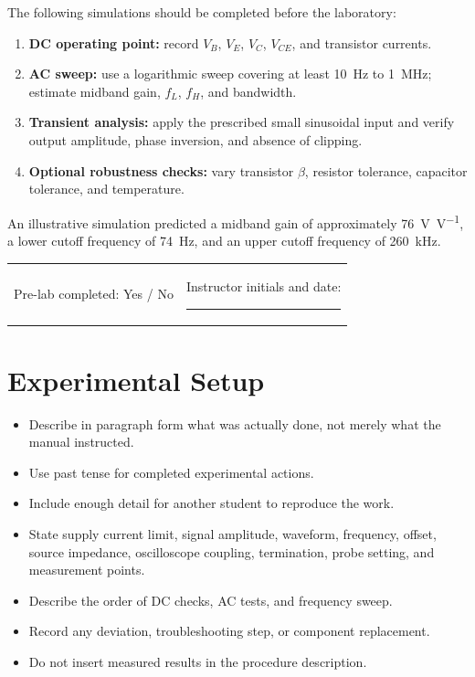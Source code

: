 \documentclass[11pt,a4paper]{article}
\newcommand{\blankfield}[1]{\rule{#1}{0.4pt}}
\begin{document}
\begin{examplebox}
The following simulations should be completed before the laboratory:
\begin{enumerate}
  \item \textbf{DC operating point:} record $V_B$, $V_E$, $V_C$, $V_{CE}$,
        and transistor currents.
  \item \textbf{AC sweep:} use a logarithmic sweep covering at least
        \SI{10}{\hertz} to \SI{1}{\mega\hertz}; estimate midband gain,
        $f_L$, $f_H$, and bandwidth.
  \item \textbf{Transient analysis:} apply the prescribed small sinusoidal
        input and verify output amplitude, phase inversion, and absence of
        clipping.
  \item \textbf{Optional robustness checks:} vary transistor $\beta$,
        resistor tolerance, capacitor tolerance, and temperature.
\end{enumerate}

An illustrative simulation predicted a midband gain of approximately
\SI{76}{\volt\per\volt}, a lower cutoff frequency of
\SI{74}{\hertz}, and an upper cutoff frequency of
\SI{260}{\kilo\hertz}.
\end{examplebox}

\begin{verificationbox}
\begin{tabularx}{\textwidth}{X X}
Pre-lab completed: \quad Yes / No &
Instructor initials and date: \blankfield{43mm}
\end{tabularx}
\end{verificationbox}

\section{Experimental Setup}
\begin{sectionguide}
\begin{itemize}
  \item Describe in paragraph form what was actually done, not merely what the
        manual instructed.
  \item Use past tense for completed experimental actions.
  \item Include enough detail for another student to reproduce the work.
  \item State supply current limit, signal amplitude, waveform, frequency,
        offset, source impedance, oscilloscope coupling, termination, probe
        setting, and measurement points.
  \item Describe the order of DC checks, AC tests, and frequency sweep.
  \item Record any deviation, troubleshooting step, or component replacement.
  \item Do not insert measured results in the procedure description.
\end{itemize}
\end{sectionguide}
\end{document}
